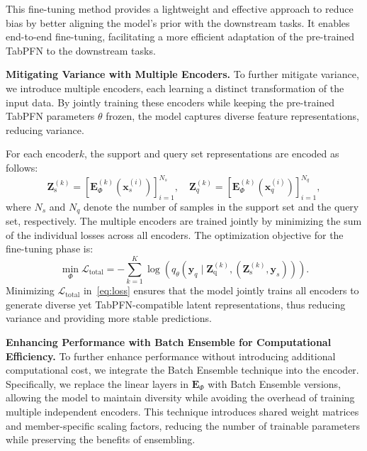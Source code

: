This fine-tuning method provides a lightweight and effective approach to reduce bias by better aligning the model’s prior with the downstream tasks.  It enables end-to-end fine-tuning, facilitating a more  efficient adaptation of the pre-trained TabPFN to the downstream tasks.


\textbf{Mitigating Variance with Multiple Encoders.}  
To further mitigate variance, we introduce multiple encoders, each learning a distinct transformation of the input data. By jointly training these encoders while keeping the pre-trained TabPFN parameters \(\theta\) frozen, the model captures diverse feature representations, reducing variance.

For each encoder\( k \), the support and query set representations are encoded as follows:
\[
\boldsymbol{Z}_{\text{s}}^{(k)} = \left[ \boldsymbol{E}^{(k)}_{\Phi}(\boldsymbol{x}_s^{(i)}) \right]_{i=1}^{N_{s}}, \quad \boldsymbol{Z}_{q}^{(k)} = \left[ \boldsymbol{E}^{(k)}_{\Phi}(\boldsymbol{x}_{q}^{(i)}) \right]_{i=1}^{N_{q}},
\]
where $N_s$ and $N_q$
denote the number of samples in the support set and the query set, respectively.
The multiple encoders are trained jointly by minimizing the sum of the individual losses across all encoders. The optimization objective for the fine-tuning phase is:
\begin{equation}
\label{eq:loss}
\min_{\Phi}\mathcal{L}_{\text{total}} = -\sum_{k=1}^{K} \log\left(q_{\theta}\left(\boldsymbol{y}_{q} \mid \boldsymbol{Z}_{\text{q}}^{(k)}, \left(\boldsymbol{Z}_{\text{s}}^{(k)}, \boldsymbol{y}_{s}\right)\right)\right).
\end{equation}
Minimizing \( \mathcal{L}_{\text{total}} \) in~\autoref{eq:loss} ensures that the model jointly trains all encoders to generate diverse yet TabPFN-compatible latent representations, thus reducing variance and providing more stable predictions.


\textbf{Enhancing Performance with Batch Ensemble for Computational Efficiency.}
To further enhance performance without introducing additional computational cost, we integrate the Batch Ensemble technique into the encoder. Specifically, we replace the linear layers in \( \boldsymbol{E}_{\Phi} \) with Batch Ensemble versions, allowing the model to maintain diversity while avoiding the overhead of training multiple independent encoders. This technique introduces shared weight matrices and member-specific scaling factors, reducing the number of trainable parameters while preserving the benefits of ensembling.  

